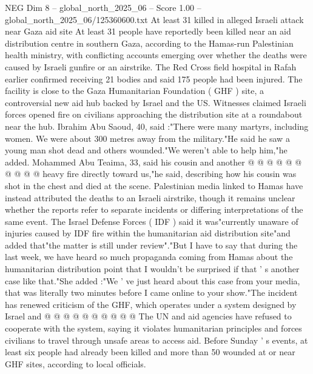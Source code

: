 \begin{textsample}{NEG Dim 8 – global\_north\_2025\_06 – Score 1.00 – global\_north\_2025\_06/125360600.txt}  \label{ex:f8_neg_405}
At least 31 killed in alleged Israeli attack near Gaza aid site At least 31 people have reportedly been killed near an aid distribution centre in southern Gaza, according to the Hamas-run Palestinian health ministry, with conflicting accounts emerging over whether the deaths were caused by Israeli gunfire or an airstrike.
The Red Cross field hospital in Rafah earlier confirmed receiving 21 bodies and said 175 people had been injured.
The facility is close to the Gaza Humanitarian Foundation ( GHF ) site, a controversial new aid hub backed by Israel and the US.
Witnesses claimed Israeli forces opened fire on civilians approaching the distribution site at a roundabout near the hub.
Ibrahim Abu Saoud, 40, said :"There were many martyrs, including women.
We were about 300 metres away from the military."He said he saw a young man shot dead and others wounded."We weren't able to help him,"he added.
Mohammed Abu Teaima, 33, said his cousin and another @ @ @ @ @ @ @ @ @ @ heavy fire directly toward us,"he said, describing how his cousin was shot in the chest and died at the scene.
Palestinian media linked to Hamas have instead attributed the deaths to an Israeli airstrike, though it remains unclear whether the reports refer to separate incidents or differing interpretations of the same event.
The Israel Defense Forces ( IDF ) said it was"currently unaware of injuries caused by IDF fire within the humanitarian aid distribution site"and added that"the matter is still under review"."But I have to say that during the last week, we have heard so much propaganda coming from Hamas about the humanitarian distribution point that I wouldn't be surprised if that ' s another case like that."She added :"We ' ve just heard about this case from your media, that was literally two minutes before I came online to your show."The incident has renewed criticism of the GHF, which operates under a system designed by Israel and @ @ @ @ @ @ @ @ @ @ The UN and aid agencies have refused to cooperate with the system, saying it violates humanitarian principles and forces civilians to travel through unsafe areas to access aid.
Before Sunday ' s events, at least six people had already been killed and more than 50 wounded at or near GHF sites, according to local officials.

\end{textsample}
